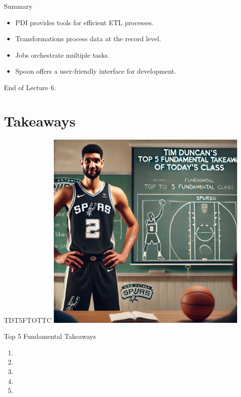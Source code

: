 \documentclass{beamer}
\begin{document}
\begin{frame}{Summary}
    \begin{itemize}
        \item PDI provides tools for efficient ETL processes.
        \item Transformations process data at the record level.
        \item Jobs orchestrate multiple tasks.
        \item Spoon offers a user-friendly interface for development.
    \end{itemize}
\end{frame}


\begin{frame}{}
    \centering
    \Huge End of Lecture 6.
\end{frame}

\section*{Takeaways}

\begin{frame}{TDT5FTOTTC}
    \centering
    \includegraphics[width=0.75\textwidth]{figures/tim}
\end{frame}

\begin{frame}{Top 5 Fundamental Takeaways}
    \small
    \begin{enumerate}
        \item[5] \pause
        \item[4] \pause
        \item[3] \pause
        \item[2] \pause
        \item[1]
    \end{enumerate}
\end{frame}
\end{document}
